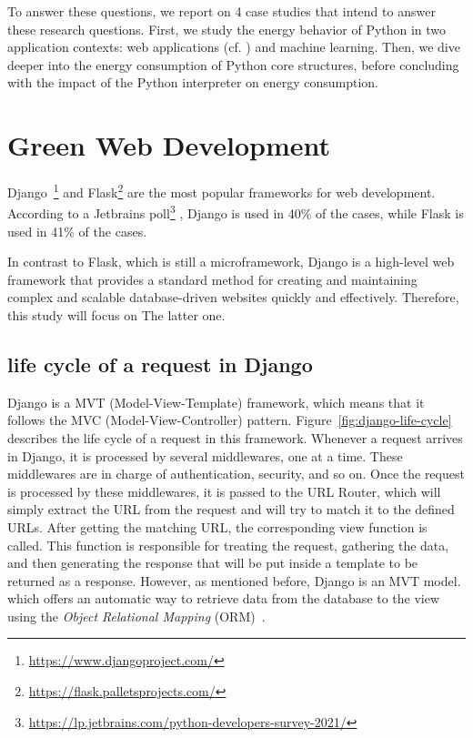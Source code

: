To answer these questions, we report on 4 case studies that intend to answer these research questions.
First, we study the energy behavior of Python in two application contexts: web applications (cf. ) and machine learning.
Then, we dive deeper into the energy consumption of Python core structures, before concluding with the impact of the Python interpreter on energy consumption.

\section{Green Web Development}\label{sec:webdev}
Django~\footnote{\url{https://www.djangoproject.com/}} and Flask\footnote{\url{https://flask.palletsprojects.com/}}  are the most popular frameworks for web development. According to a Jetbrains poll\footnote{\url{https://lp.jetbrains.com/python-developers-survey-2021/}} , Django is used in 40\% of the cases, while Flask is used in 41\% of the cases.

In contrast to Flask, which is still a microframework, Django is a high-level web framework that provides a standard method for creating and maintaining complex and scalable database-driven websites quickly and effectively. Therefore, this study will focus on The latter one.

\subsection{life cycle of a request in Django}

Django is a MVT (Model-View-Template) framework, which means that it follows the MVC (Model-View-Controller) pattern. Figure~\ref{fig:django-life-cycle} describes the life cycle of a request in this framework.  Whenever a request arrives in Django, it is processed by several middlewares, one at a time. These middlewares are in charge of authentication, security, and so on.
Once the request is processed by these middlewares, it is passed to the URL Router, which will simply extract the URL from the request and will try to match it to the defined URLs.
After getting the matching URL, the corresponding view function is called. This function is responsible for treating the request, gathering the data, and then generating the response that will be put inside a template to be returned as a response.
However, as mentioned before, Django is an MVT model. which offers an automatic way to retrieve data from the database to the view using the \emph{Object Relational Mapping} (ORM)~\cite{o2008object}.


